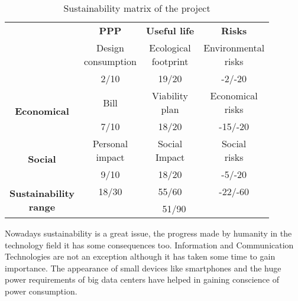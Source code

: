 \begin{table}[H]
  \centering
  \begin{tabular}{|c|c|c|c|}
    \cline{2-4}
    \multicolumn{1}{c|}{} & \textbf{PPP} & \textbf{Useful life} & \textbf{Risks} \\ 
    \hhline{-===}

    \multirow[c]{2}{*}{\textbf{Environmental}} & 
    \makecell{Design \\ consumption} & \makecell{Ecological \\ footprint} & 
    \makecell{Environmental \\ risks} \\ \cline{2-4}
    & 2/10 & 19/20 & -2/-20 \\ \hline
    
    \multirow{2}{*}{\textbf{Economical}} & 
    Bill & \makecell{Viability \\ plan} & \makecell{Economical \\ risks} \\ \cline{2-4}
    & 7/10 & 18/20 & -15/-20 \\ \hline

    \multirow{2}{*}{\textbf{Social}} &
    \makecell{Personal \\ impact} & \makecell{Social \\ Impact} & 
    \makecell{Social \\ risks} \\ \cline{2-4} 
    & 9/10 & 18/20 & -5/-20 \\ \hline

    \hline\hline
    \multirow{2}{*}{\parbox[c]{3cm}{\centering\textbf{Sustainability \\ range}}} &
    18/30 & 55/60 & -22/-60 \\ \cline{2-4}
    & \multicolumn{3}{c|}{51/90} \\ \hline

  \end{tabular}
  \caption{Sustainability matrix of the project \label{tab:sustainability}}
\end{table}


Nowadays sustainability is a great issue, the progress made by humanity in the technology
field it has some consequences too. Information and Communication Technologies are not 
an exception although it has taken some time to gain importance. The appearance of 
small devices like smartphones and the huge power requirements of big data centers have 
helped in gaining conscience of power consumption. 

